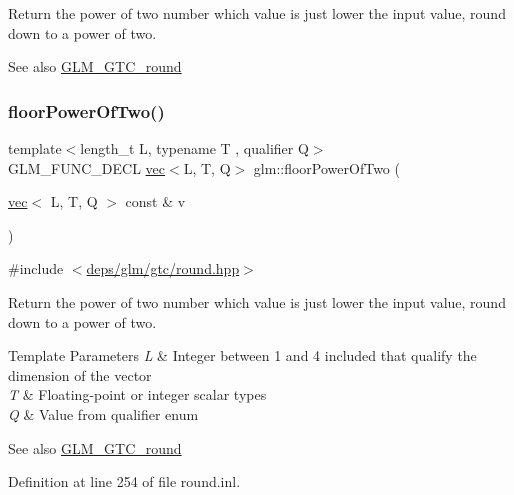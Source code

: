 Return the power of two number which value is just lower the input value, round down to a power of two.

\begin{DoxySeeAlso}{See also}
\hyperlink{group__gtc__round}{G\+L\+M\+\_\+\+G\+T\+C\+\_\+round} 
\end{DoxySeeAlso}
\mbox{\label{group__gtc__round_gaf0d591a8fca8ddb9289cdeb44b989c2d}} 
\subsubsection{\texorpdfstring{floor\+Power\+Of\+Two()}{floorPowerOfTwo()}\hspace{0.1cm}{\footnotesize\ttfamily [2/2]}}
{\footnotesize\ttfamily template$<$length\+\_\+t L, typename T , qualifier Q$>$ \\
G\+L\+M\+\_\+\+F\+U\+N\+C\+\_\+\+D\+E\+CL \hyperlink{structglm_1_1vec}{vec}$<$L, T, Q$>$ glm\+::floor\+Power\+Of\+Two (\begin{DoxyParamCaption}\item[{\hyperlink{structglm_1_1vec}{vec}$<$ L, T, Q $>$ const \&}]{v }\end{DoxyParamCaption})}



{\ttfamily \#include $<$\hyperlink{round_8hpp}{deps/glm/gtc/round.\+hpp}$>$}

Return the power of two number which value is just lower the input value, round down to a power of two.


\begin{DoxyTemplParams}{Template Parameters}
{\em L} & Integer between 1 and 4 included that qualify the dimension of the vector \\
\hline
{\em T} & Floating-\/point or integer scalar types \\
\hline
{\em Q} & Value from qualifier enum\\
\hline
\end{DoxyTemplParams}
\begin{DoxySeeAlso}{See also}
\hyperlink{group__gtc__round}{G\+L\+M\+\_\+\+G\+T\+C\+\_\+round} 
\end{DoxySeeAlso}


Definition at line 254 of file round.\+inl.

